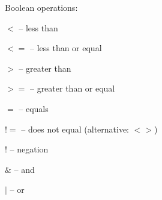 \documentclass[a4paper]{book}
\begin{document}
\noindent Boolean operations:
\begin{tight_itemize}
	\item \textit{$<$} -- less than
	\item \textit{$<=$} -- less than or equal
	\item \textit{$>$} -- greater than
	\item \textit{$>=$} -- greater than or equal
	\item \textit{$=$} -- equals
	\item \textit{$!=$} -- does not equal (alternative: \textit{$<>$})
	\item \textit{$!$} -- negation
	\item \textit{$\&$} -- and
	\item \textit{$|$} -- or
\end{tight_itemize}
\end{document}
